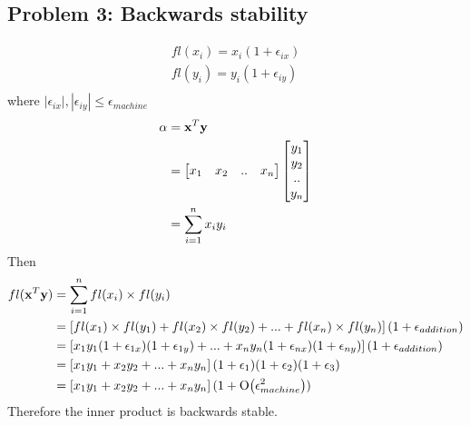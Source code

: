 \documentclass{article}
\newcommand{\BigO}[1]{\ensuremath{\operatorname{O}\bigl(#1\bigr)}}
\begin{document}
\hypertarget{}{}
\subsection*{{Problem 3: Backwards stability}}
\label{}

\begin{align*}
fl(x_i) = x_i(1+\epsilon_{ix}) \\
fl(y_i) = y_i(1+\epsilon_{iy}) \\
\end{align*} 
where $|\epsilon_{ix}|, |\epsilon_{iy}|\leq\epsilon_{machine} $ \\
\begin{align*}
\alpha &=\boldsymbol{\mathrm{x}}^T\boldsymbol{\mathrm{y}} \\
& = \begin{bmatrix} x_1 & x_2 & .. & x_n \end{bmatrix}\begin{bmatrix} y_1 \\ y_2 \\ .. \\ y_n \end{bmatrix} \\
& = \sum_{i=1}^nx_i y_i \\ 
\end{align*} 
Then \begin{align*} 
fl(\vx^T\vy) & = \sum_{i=1}^nfl(x_i)\times fl( y_i) \\
& = \left[fl(x_1)\times fl(y_1)+ fl(x_2)\times fl(y_2) + ... + fl(x_n)\times fl(y_n)\right] (1+\epsilon_{addition})\\
& = \left[x_1y_1(1+\epsilon_{1x})(1+\epsilon_{1y}) + ... + x_ny_n(1+\epsilon_{nx})(1+\epsilon_{ny})\right](1+\epsilon_{addition}) \\ 
& = \left[x_1y_1 + x_2y_2 + ... +x_ny_n\right](1+\epsilon_1)(1+\epsilon_2)(1+\epsilon_3)\\
& = \left[x_1y_1 + x_2y_2 + ... +x_ny_n\right](1+\BigO{\epsilon_{machine}^2})
\end{align*}
Therefore the inner product is backwards stable. \\
\end{document}
